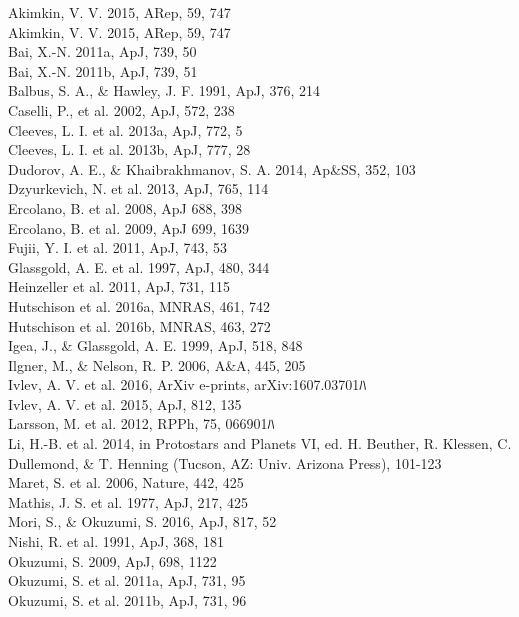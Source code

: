 \documentclass[10pt,fleqn,twoside]{article}
\begin{document}
\noindent
Akimkin, V. V. 2015, ARep, 59, 747 \\
Akimkin, V. V. 2015, ARep, 59, 747 \\
Bai, X.-N. 2011a, ApJ, 739, 50 \\
Bai, X.-N. 2011b, ApJ, 739, 51 \\
Balbus, S. A., \& Hawley, J. F. 1991, ApJ, 376, 214 \\
Caselli, P., et al. 2002, ApJ, 572, 238 \\
Cleeves, L. I. et al. 2013a, ApJ, 772, 5 \\
Cleeves, L. I. et al. 2013b, ApJ, 777, 28 \\
Dudorov, A. E., \& Khaibrakhmanov, S. A. 2014, Ap\&SS, 352, 103 \\
Dzyurkevich, N. et al. 2013, ApJ, 765, 114 \\
Ercolano, B. et al. 2008, ApJ 688, 398 \\
Ercolano, B. et al. 2009, ApJ 699, 1639\\
Fujii, Y. I. et al. 2011, ApJ, 743, 53 \\
Glassgold, A. E. et al. 1997, ApJ, 480, 344 \\
Heinzeller et al. 2011, ApJ, 731, 115 \\
Hutschison et al. 2016a, MNRAS, 461, 742\\
Hutschison et al. 2016b, MNRAS, 463, 272\\ 
Igea, J., \& Glassgold, A. E. 1999, ApJ, 518, 848 \\
Ilgner, M., \& Nelson, R. P. 2006, A\&A, 445, 205 \\
Ivlev, A. V. et al. 2016, ArXiv e-prints, arXiv:1607.03701ﾊ\\ 
Ivlev, A. V. et al.  2015, ApJ, 812, 135 \\
Larsson, M. et al. 2012, RPPh, 75, 066901ﾊ\\  
Li, H.-B. et al. 2014, in Protostars and Planets VI, ed. H. Beuther, R. Klessen, C. Dullemond, \& T. Henning (Tucson, AZ: Univ. Arizona Press), 101-123 \\
Maret, S. et al. 2006, Nature, 442, 425 \\ 
Mathis, J. S. et al. 1977, ApJ, 217, 425 \\
Mori, S., \& Okuzumi, S. 2016, ApJ, 817, 52 \\ 
Nishi, R. et al. 1991, ApJ, 368, 181 \\
Okuzumi, S. 2009, ApJ, 698, 1122 \\
Okuzumi, S. et al. 2011a, ApJ, 731, 95 \\
Okuzumi, S. et al. 2011b, ApJ, 731, 96 \\
\end{document}
